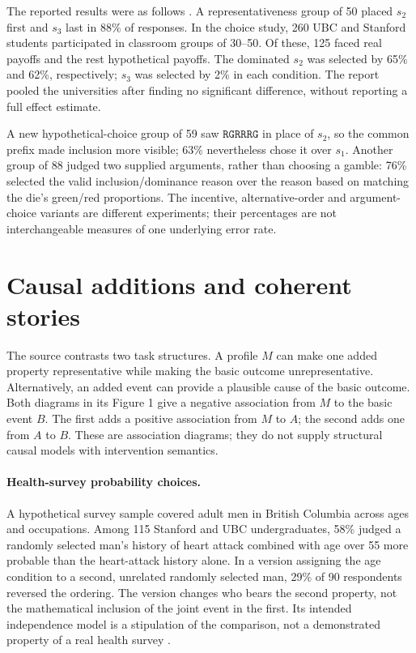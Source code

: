The reported results were as follows
\cite[pp.~303--304]{TverskyKahneman1983Conjunction}.
A representativeness group of 50 placed \(s_2\) first and \(s_3\)
last in 88\% of responses.
In the choice study, 260 UBC and Stanford students participated in
classroom groups of 30--50. Of these, 125 faced real payoffs and
the rest hypothetical payoffs. The dominated \(s_2\) was selected
by 65\% and 62\%, respectively; \(s_3\) was selected by 2\% in
each condition. The report pooled the universities after finding no
significant difference, without reporting a full effect estimate.

A new hypothetical-choice group of 59 saw
\(\texttt{RGRRRG}\) in place of \(s_2\), so the common prefix
made inclusion more visible; 63\% nevertheless chose it over \(s_1\).
Another group of 88 judged two supplied arguments, rather than
choosing a gamble: 76\% selected the valid inclusion/dominance reason
over the reason based on matching the die's green/red proportions.
The incentive, alternative-order and argument-choice variants are
different experiments; their percentages are not interchangeable
measures of one underlying error rate.

\section{Causal additions and coherent stories}
\label{sec:p19-conjunction-causes}

The source contrasts two task structures. A profile \(M\) can make one
added property representative while making the basic outcome
unrepresentative. Alternatively, an added event can provide a
plausible cause of the basic outcome. Both diagrams in its Figure 1
give a negative association from \(M\) to the basic event \(B\).
The first adds a positive association from \(M\) to \(A\); the second
adds one from \(A\) to \(B\). These are association diagrams;
they do not supply structural causal models with intervention semantics.

\paragraph{Health-survey probability choices.}
A hypothetical survey sample covered adult men in British Columbia
across ages and occupations. Among 115 Stanford and UBC undergraduates,
58\% judged a randomly selected man's history of heart attack combined
with age over 55 more probable than the heart-attack history alone.
In a version assigning the age condition to a second, unrelated
randomly selected man, 29\% of 90 respondents reversed the ordering.
The version changes who bears the second property, not the
mathematical inclusion of the joint event in the first.
Its intended independence model is a stipulation of the comparison,
not a demonstrated property of a real health survey
\cite[pp.~305--306]{TverskyKahneman1983Conjunction}.

